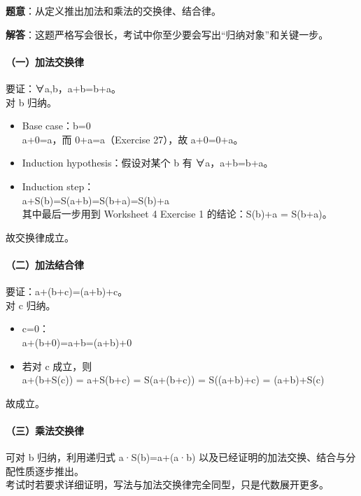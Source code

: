 \documentclass[
  11pt,
]{article}
\providecommand{\tightlist}{%
  \setlength{\itemsep}{0pt}\setlength{\parskip}{0pt}}
\begin{document}
\textbf{题意}：从定义推出加法和乘法的交换律、结合律。

\textbf{解答}：这题严格写会很长，考试中你至少要会写出``归纳对象''和关键一步。

\paragraph{（一）加法交换律}\label{ux4e00ux52a0ux6cd5ux4ea4ux6362ux5f8b}

要证：∀a,b，a+b=b+a。\\
对 b 归纳。

\begin{itemize}
\item
  Base case：b=0\\
  a+0=a，而 0+a=a（Exercise 27），故 a+0=0+a。
\item
  Induction hypothesis：假设对某个 b 有 ∀a，a+b=b+a。
\item
  Induction step：\\
  a+S(b)=S(a+b)=S(b+a)=S(b)+a\\
  其中最后一步用到 Worksheet 4 Exercise 1 的结论：S(b)+a = S(b+a)。
\end{itemize}

故交换律成立。

\paragraph{（二）加法结合律}\label{ux4e8cux52a0ux6cd5ux7ed3ux5408ux5f8b}

要证：a+(b+c)=(a+b)+c。\\
对 c 归纳。

\begin{itemize}
\tightlist
\item
  c=0：\\
  a+(b+0)=a+b=(a+b)+0
\item
  若对 c 成立，则\\
  a+(b+S(c)) = a+S(b+c) = S(a+(b+c)) = S((a+b)+c) = (a+b)+S(c)
\end{itemize}

故成立。

\paragraph{（三）乘法交换律}\label{ux4e09ux4e58ux6cd5ux4ea4ux6362ux5f8b}

可对 b 归纳，利用递归式 a·S(b)=a+(a·b)
以及已经证明的加法交换、结合与分配性质逐步推出。\\
考试时若要求详细证明，写法与加法交换律完全同型，只是代数展开更多。
\end{document}
